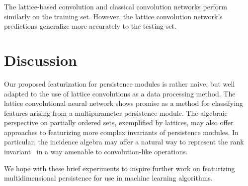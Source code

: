 \documentclass{article}
\begin{document}
The lattice-based convolution and classical convolution networks perform
similarly on the training set. However, the lattice convolution network's
predictions generalize more accurately to the testing set.

\section{Discussion}
Our proposed featurization for persistence modules is rather naive, but well
adapted to the use of lattice convolutions as a data processing method. The
lattice convolutional neural network shows promise as a method for classifying
features arising from a multiparameter persistence module. The algebraic
perspective on partially ordered sets, exemplified by lattices, may also offer
approaches to featurizing more complex invariants of persistence modules. In
particular, the incidence algebra may offer a natural way to represent the rank
invariant~\cite{carlsson_theory_2009} in a way amenable to convolution-like
operations.

We hope with these brief experiments to inspire further work on featurizing
multidimensional persistence for use in machine learning algorithms.



\end{document}
